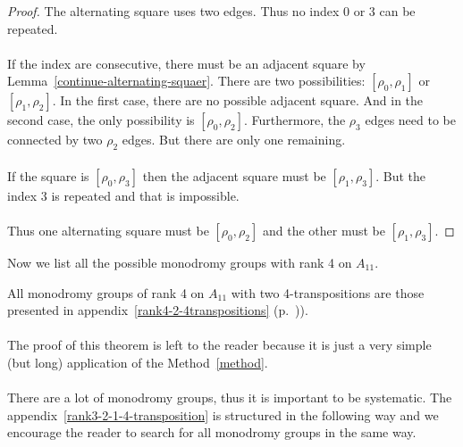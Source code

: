 \begin{proof}
  The alternating square uses two edges. Thus no index $0$ or $3$ can be repeated.

  \paragraph{}
  If the index are consecutive, there must be an adjacent square by Lemma~\ref{continue-alternating-squaer}. There are two possibilities: $[\rho_0, \rho_1]$ or $[\rho_1, \rho_2]$. In the first case, there are no possible adjacent square. And in the second case, the only possibility is $[\rho_0, \rho_2]$. Furthermore, the $\rho_3$ edges need to be connected by two $\rho_2$ edges. But there are only one remaining.

  \paragraph{}
  If the square is $[\rho_0, \rho_3]$ then the adjacent square must be $[\rho_1, \rho_3]$. But the index $3$ is repeated and that is impossible.

  \paragraph{}
  Thus one alternating square must be $[\rho_0, \rho_2]$ and the other must be $[\rho_1, \rho_3]$.

\end{proof}

Now we list all the possible monodromy groups with rank 4 on $A_{11}$.

\begin{theorem}
  All monodromy groups of rank 4 on $A_{11}$ with two 4-transpositions are those presented in appendix~\ref{rank4-2-4transpositions} (p.~\pageref{rank4-2-4transpositions})).
\end{theorem}

\paragraph{}
The proof of this theorem is left to the reader because it is just a very simple (but long) application of the Method~\ref{method}.

\paragraph{}
There are a lot of monodromy groups, thus it is important to be systematic. The appendix~\ref{rank3-2-1-4-transposition} is structured in the following way and we encourage the reader to search for all monodromy groups in the same way.

